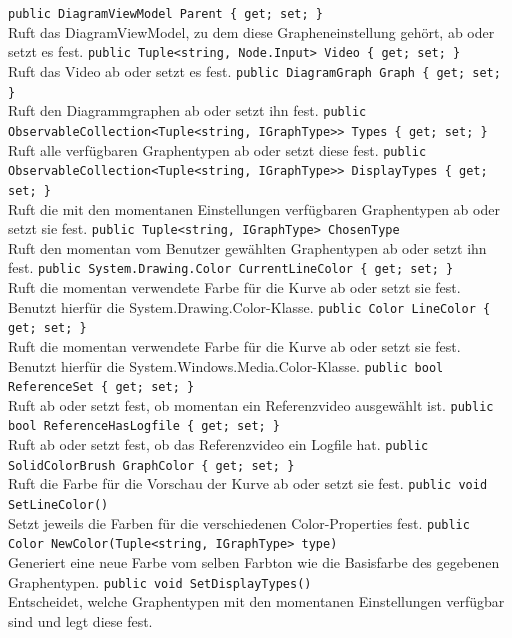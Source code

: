 \begin{itemize}
	\add \verb!public DiagramViewModel Parent { get; set; }! \\
	Ruft das DiagramViewModel, zu dem diese Grapheneinstellung gehört, ab oder setzt es fest.
	\add \verb!public Tuple<string, Node.Input> Video { get; set; }! \\
	Ruft das Video ab oder setzt es fest.
	\add \verb!public DiagramGraph Graph { get; set; }! \\
	Ruft den Diagrammgraphen ab oder setzt ihn fest.
	\add \verb!public ObservableCollection<Tuple<string, IGraphType>> Types { get; set; }! \\
	Ruft alle verfügbaren Graphentypen ab oder setzt diese fest.
	\add \verb!public ObservableCollection<Tuple<string, IGraphType>> DisplayTypes { get; set; }! \\
	Ruft die mit den momentanen Einstellungen verfügbaren Graphentypen ab oder setzt sie fest.
	\add \verb!public Tuple<string, IGraphType> ChosenType! \\
	Ruft den momentan vom Benutzer gewählten Graphentypen ab oder setzt ihn fest.
	\add \verb!public System.Drawing.Color CurrentLineColor { get; set; }! \\
	Ruft die momentan verwendete Farbe für die Kurve ab oder setzt sie fest. Benutzt hierfür die System.Drawing.Color-Klasse.
	\add \verb!public Color LineColor { get; set; }! \\
	Ruft die momentan verwendete Farbe für die Kurve ab oder setzt sie fest. Benutzt hierfür die System.Windows.Media.Color-Klasse.
	\add \verb!public bool ReferenceSet { get; set; }! \\
	Ruft ab oder setzt fest, ob momentan ein Referenzvideo ausgewählt ist.
	\add \verb!public bool ReferenceHasLogfile { get; set; }! \\
	Ruft ab oder setzt fest, ob das Referenzvideo ein Logfile hat.
	\add \verb!public SolidColorBrush GraphColor { get; set; }! \\
	Ruft die Farbe für die Vorschau der Kurve ab oder setzt sie fest.
	\add \verb!public void SetLineColor()! \\
	Setzt jeweils die Farben für die verschiedenen Color-Properties fest.
	\add \verb!public Color NewColor(Tuple<string, IGraphType> type)! \\
	Generiert eine neue Farbe vom selben Farbton wie die Basisfarbe des gegebenen Graphentypen.
	\add \verb!public void SetDisplayTypes()! \\
	Entscheidet, welche Graphentypen mit den momentanen Einstellungen verfügbar sind und legt diese fest.
\end{itemize}

